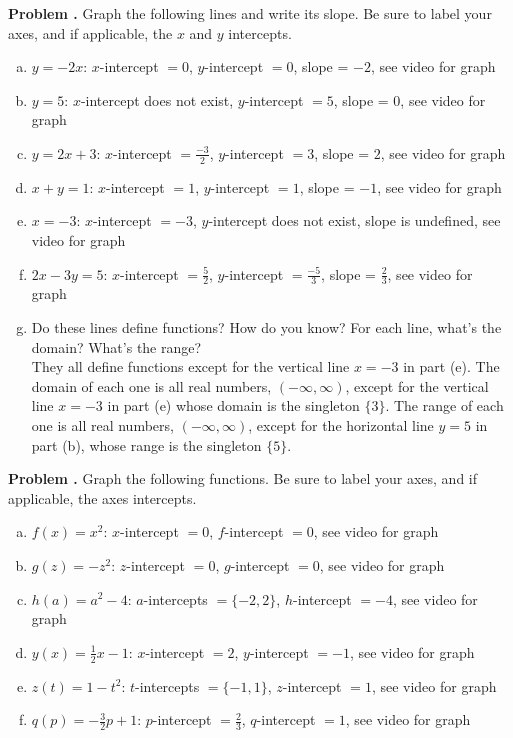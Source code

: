 \documentclass[11pt,letterpaper]{article}
\newcounter{problem}
\newcommand{\problem}{
	\stepcounter{problem}%
	\noindent \textbf{Problem \theproblem. }%
}
\begin{document}
\newpage


\problem Graph the following lines and write its slope. Be sure to label your axes, and if applicable, the $x$ and $y$ intercepts. \\
\begin{enumerate}[(a)]
	\item $y = -2x$: $x$-intercept $= 0$, $y$-intercept $= 0$, slope = $-2$, see video for graph
	\item $y = 5$: $x$-intercept does not exist, $y$-intercept $= 5$, slope = $0$, see video for graph
	\item $y = 2x + 3$: $x$-intercept $= \frac{-3}{2}$, $y$-intercept $= 3$, slope = $2$, see video for graph
	\item $x + y = 1$: $x$-intercept $= 1$, $y$-intercept $= 1$, slope = $-1$, see video for graph
	\item $x = -3$: $x$-intercept $= -3$, $y$-intercept does not exist, slope is undefined, see video for graph
	\item $2x - 3y = 5$: $x$-intercept $= \frac{5}{2}$, $y$-intercept $= \frac{-5}{3}$, slope = $\frac{2}{3}$, see video for graph
	\item Do these lines define functions? How do you know? For each line, what's the domain? What's the range?\\
	They all define functions except for the vertical line $x = -3$ in part (e). The domain of each one is all real numbers, $( -\infty, \infty)$, except for the vertical line $x = -3$ in part (e) whose domain is the singleton $\{ 3\}$. The range of each one is all real numbers, $( -\infty, \infty)$, except for the horizontal line $y = 5$ in part (b), whose range is the singleton $\{5\}$.
\end{enumerate} 

\vspace{.5cm}


\problem Graph the following functions. Be sure to label your axes, and if applicable, the axes intercepts. \\
\begin{enumerate}[(a)]
	\item $f(x) = x^2$: $x$-intercept $= 0$, $f$-intercept $= 0$, see video for graph 
	\item $g(z) = -z^2$: $z$-intercept $= 0$, $g$-intercept $= 0$, see video for graph
	\item $h(a) = a^2 - 4$: $a$-intercepts $= \{-2,2\}$, $h$-intercept $= -4$, see video for graph
	\item $y(x) = \frac{1}{2}x - 1$: $x$-intercept $= 2$, $y$-intercept $= -1$, see video for graph
	\item $z(t) = 1 - t^2$: $t$-intercepts $= \{-1, 1\}$, $z$-intercept $= 1$, see video for graph
	\item $q(p) = -\frac{3}{2}p + 1$: $p$-intercept $= \frac{2}{3}$, $q$-intercept $= 1$, see video for graph
\end{enumerate}
\end{document}
